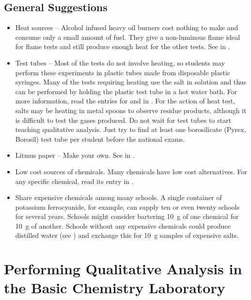 \subsection{General Suggestions}
\begin{itemize}
\item{Heat sources – Alcohol infused heavy oil burners 
cost nothing to make and consume only a small amount of fuel. 
They give a non-luminous flame ideal for flame tests 
and still produce enough heat for the other tests. 
See  in .}
\item{Test tubes – Most of the tests do not involve heating, 
so students may perform these experiments in plastic tubes 
made from disposable plastic syringes. 
Many of the tests requiring heating use the salt in solution 
and thus can be performed 
by holding the plastic test tube in a hot water bath. 
For more information, 
read the entries for  
and  in .
For the action of heat test, 
salts may be heating in metal spoons to observe residue products, 
although it is difficult to test the gases produced. 
Do not wait for test tubes to start teaching qualitative analysis. 
Just try to find at least one borosilicate (Pyrex, 
Borosil) test tube per student before the national exams.}
\item{Litmus paper – Make your own. 
See  in .}
\item{Low cost sources of chemicals. 
Many chemicals have low cost alternatives. 
For any specific chemical, 
read its entry in .}
\item{Share expensive chemicals among many schools. 
A single container of potassium ferrocyanide, 
for example, 
can supply ten or even twenty schools for several years. 
Schools might consider bartering 10~g of one chemical for 10~g of another. 
Schools without any expensive chemicals could produce distilled water (see ) and exchange this for 10~g samples of expensive salts.}
\end{itemize} 
 
\section{Performing Qualitative Analysis in the Basic Chemistry Laboratory}

